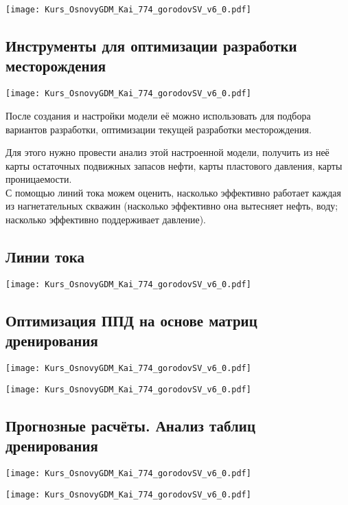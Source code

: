 \documentclass[main.tex]{subfiles}
\begin{document}
\texttt{[image: Kurs\_OsnovyGDM\_Kai\_774\_gorodovSV\_v6\_0.pdf]}

\subsection{Инструменты для оптимизации разработки месторождения}

\texttt{[image: Kurs\_OsnovyGDM\_Kai\_774\_gorodovSV\_v6\_0.pdf]}

После создания и настройки модели её можно использовать для подбора вариантов разработки, оптимизации текущей разработки месторождения.

Для этого нужно провести анализ этой настроенной модели, получить из неё карты остаточных подвижных запасов нефти, карты пластового давления, карты проницаемости.\\

С помощью линий тока можем оценить, насколько эффективно работает каждая из нагнетательных скважин (насколько эффективно она вытесняет нефть, воду; насколько эффективно поддерживает давление).

\subsection{Линии тока}

\texttt{[image: Kurs\_OsnovyGDM\_Kai\_774\_gorodovSV\_v6\_0.pdf]}

\subsection{Оптимизация ППД на основе матриц дренирования}

\texttt{[image: Kurs\_OsnovyGDM\_Kai\_774\_gorodovSV\_v6\_0.pdf]}



\texttt{[image: Kurs\_OsnovyGDM\_Kai\_774\_gorodovSV\_v6\_0.pdf]}

\subsection{Прогнозные расчёты. Анализ таблиц дренирования}

\texttt{[image: Kurs\_OsnovyGDM\_Kai\_774\_gorodovSV\_v6\_0.pdf]}

\texttt{[image: Kurs\_OsnovyGDM\_Kai\_774\_gorodovSV\_v6\_0.pdf]}
\end{document}
